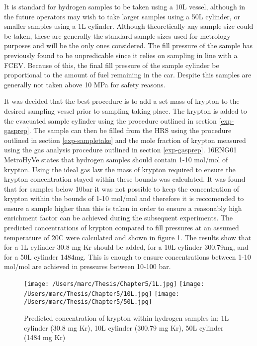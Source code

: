 It is standard for hydrogen samples to be taken using a 10L vessel, although in the future operators may wish to take larger samples using a 50L cylinder, or smaller samples using a 1L cylinder. Although theoretically any sample size could be taken, these are generally the standard sample sizes used for metrology purposes and will be the only ones considered. The fill pressure of the sample has previously found to be unpredicable since it relies on sampling in line with a FCEV. Because of this, the final fill pressure of the sample cylinder be proportional to the amount of fuel remaining in the car. Despite this samples are generally not taken above 10 MPa for safety reasons. 

It was decided that the best procedure is to add a set mass of krypton to the desired sampling vessel prior to sampling taking place. The krypton is added to the evacuated sample cylinder using the procedure outlined in section \ref{exp-gasprep}. The sample can then be filled from the HRS using the procedure outlined in section \ref{exp-sampletake} and the mole fraction of krypton measured using the gas analysis procedure outlined in section \ref{exp-gasprep}. 16ENG01 MetroHyVe states that hydrogen samples should contain 1-10 \textmu mol/mol of krypton. Using the ideal gas law the mass of krypton required to ensure the krypton concentration stayed within these bounds was calculated. It was found that for samples below 10bar it was not possible to keep the concentration of krypton within the bounds of 1-10 \textmu mol/mol and therefore it is reccomended to ensure a sample higher than this is taken in order to ensure a reasonably high enrichment factor can be achieved during the subsequent experiments. The predicted concentrations of krypton compared to fill pressures at an assumed temperature of 20\textdegree C were calculated and shown in figure \ref{krsamples}. The results show that for a 1L cylinder 30.8 mg Kr should be added, for a 10L cylinder 300.79mg, and for a 50L cylinder 1484mg. This is enough to ensure concentrations between 1-10 \textmu mol/mol are achieved in pressures between 10-100 bar. 

\begin{figure}
    \centering
    \texttt{[image: /Users/marc/Thesis/Chapter5/1L.jpg]}
    \texttt{[image: /Users/marc/Thesis/Chapter5/10L.jpg]}
    \texttt{[image: /Users/marc/Thesis/Chapter5/50L.jpg]}
    \caption{Predicted concentration of krypton within hydrogen samples in; 1L cylinder (30.8 mg Kr), 10L cylinder (300.79 mg Kr), 50L cylinder (1484 mg Kr)}
    \label{krsamples}
  \end{figure}

